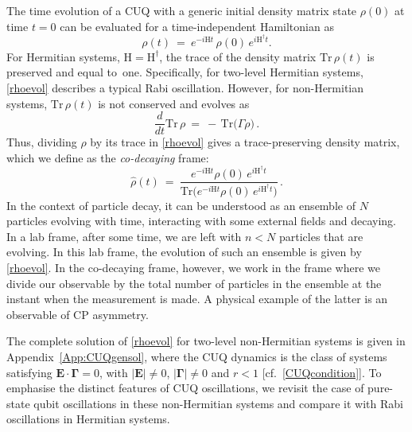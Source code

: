 \documentclass[12pt,a4paper]{article}
\begin{document}
The time evolution of a CUQ with a generic initial density matrix state $\rho(0)$ at time $t=0$ can be evaluated for a time-independent Hamiltonian\cite{Moiseyev_2011} as
\begin{equation}
  \label{rhoevol}
    \rho(t)\ =\ e^{-i\mathrm{H}t}\,\rho(0)\,e^{i\mathrm{H}^\dagger t}.
\end{equation}
For Hermitian systems, $\mathrm{H} = \mathrm{H}^{\dagger}$, the trace of the density matrix $\text{Tr}\,\rho(t)$ is preserved and equal to~one. Specifically, for two-level Hermitian systems, \eqref{rhoevol} describes a typical Rabi oscillation. However, for non-Hermitian systems, $\text{Tr}\,\rho(t)$ 
is not conserved and evolves as
\begin{equation}
    \dfrac{d}{dt}\mathrm{Tr}\,\rho\: =\: -\,\mathrm{Tr}\big(\Gamma\rho\big)\,.
\end{equation}
Thus, dividing $\rho$ by its trace in \eqref{rhoevol} gives a trace-preserving density matrix, which we define as the {\em co-decaying} frame: 
\begin{equation}
    \hat{\rho} (t)\: =\: \dfrac{e^{-i\mathrm{H}t}\rho(0)\,e^{i\mathrm{H}^\dagger t}}{\mathrm{Tr}\big(e^{-i\mathrm{H}t}\rho(0)\,e^{i\mathrm{H}^\dagger t}\big)}\, .\label{rhoevol_codec}
\end{equation}
In the context of particle decay, it can be understood as an ensemble of $N$ particles evolving with time, interacting with some external fields and decaying. In a lab frame, after some time, we are left with $n<N$ particles that are evolving. In this lab frame, the evolution of such an ensemble is given by \eqref{rhoevol}. In the co-decaying frame, however, we work in the frame where we divide our observable by the total number of particles in the ensemble at the instant when the measurement is made. A physical example of the latter is an observable of CP asymmetry\cite{Karamitros:2025azy}. 

The complete solution of \eqref{rhoevol} for two-level non-Hermitian systems is given in Appendix~\ref{App:CUQgensol}, where the CUQ dynamics is the class of systems satisfying $\mathbf{E}\cdot\boldsymbol{\Gamma} = 0$, with $|\mathbf{E}|\neq0$, $|\mathbf{\Gamma}|\neq0$ and $r<1$ [cf.~\eqref{CUQcondition}]. To emphasise the distinct features of CUQ oscillations, we revisit the case of pure-state qubit oscillations in these non-Hermitian systems and compare it with Rabi oscillations in Hermitian systems. 
\end{document}
